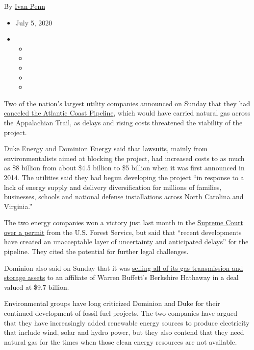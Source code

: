 By \href{https://www.nytimes3xbfgragh.onion/by/ivan-penn}{Ivan Penn}

\begin{itemize}
\item
  July 5, 2020
\item
  \begin{itemize}
  \item
  \item
  \item
  \item
  \item
  \end{itemize}
\end{itemize}

Two of the nation's largest utility companies announced on Sunday that
they had
\href{https://www.prnewswire.com/news-releases/dominion-energy-and-duke-energy-cancel-the-atlantic-coast-pipeline-301088177.html}{canceled
the Atlantic Coast Pipeline}, which would have carried natural gas
across the Appalachian Trail, as delays and rising costs threatened the
viability of the project.

Duke Energy and Dominion Energy said that lawsuits, mainly from
environmentalists aimed at blocking the project, had increased costs to
as much as \$8 billion from about \$4.5 billion to \$5 billion when it
was first announced in 2014. The utilities said they had begun
developing the project ``in response to a lack of energy supply and
delivery diversification for millions of families, businesses, schools
and national defense installations across North Carolina and Virginia.''

The two energy companies won a victory just last month in the
\href{https://www.nytimes3xbfgragh.onion/2020/02/24/us/supreme-court-appalachian-trail.html}{Supreme
Court over a permit} from the U.S. Forest Service, but said that
``recent developments have created an unacceptable layer of uncertainty
and anticipated delays'' for the pipeline. They cited the potential for
further legal challenges.

Dominion also said on Sunday that it was
\href{https://www.prnewswire.com/news-releases/dominion-energy-agrees-to-sell-gas-transmission-storage-assets-to-berkshire-hathaway-energy-strategic-repositioning-toward-pure-play-state-regulated-sustainability-focused-utility-operations-301088176.html}{selling
all of its gas transmission and storage assets} to an affiliate of
Warren Buffett's Berkshire Hathaway in a deal valued at \$9.7 billion.

Environmental groups have long criticized Dominion and Duke for their
continued development of fossil fuel projects. The two companies have
argued that they have increasingly added renewable energy sources to
produce electricity that include wind, solar and hydro power, but they
also contend that they need natural gas for the times when those clean
energy resources are not available.

